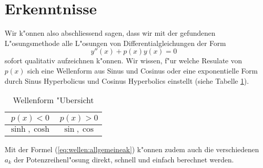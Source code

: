 \section{Erkenntnisse}
Wir k"onnen also abschliessend sagen, dass wir mit der gefundenen 
L"osungsmethode alle L"osungen von Differentialgleichungen der Form 
\begin{equation*}
	y''(x)+p(x)y(x) = 0
\end{equation*}
sofort qualitativ aufzeichnen k"onnen. Wir wissen, f"ur welche Resulate von 
$p(x)$ sich eine Wellenform aus Sinus und Cosinus oder eine exponentielle Form 
durch Sinus Hyperbolicus und Cosinus Hyperbolics einstellt (siehe Tabelle 
\ref{tab:wellen:formoverview}).
\begin{table}
	\centering
	\begin{tabular}{c | c}
		$p(x) < 0$ & $p(x) > 0$ \\\hline
		$\sinh, \cosh$ & $\sin, \cos$
	\end{tabular}
	\caption{Wellenform "Ubersicht}
	\label{tab:wellen:formoverview}
\end{table}
Mit der Formel (\ref{eq:wellen:allgemeineak}) k"onnen zudem auch die 
verschiedenen $a_k$ der Potenzreihenl"osung direkt, schnell und einfach 
berechnet werden.
